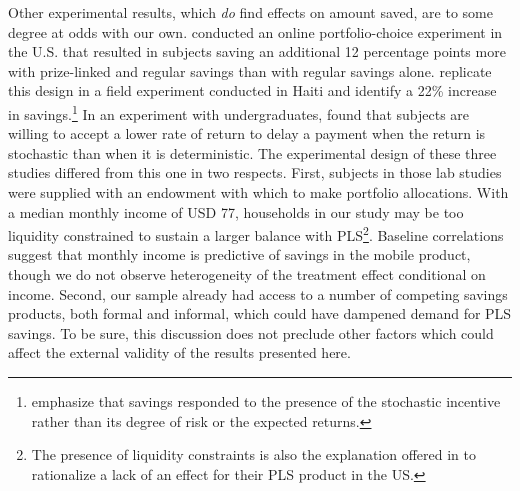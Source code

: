 \documentclass[11pt]{article}
\begin{document}
		Other experimental results, which \emph{do} find effects on amount saved, are to some degree at odds with our own. \textcite{atalay_savings_2014} conducted an online portfolio-choice experiment in the U.S. that resulted in subjects saving an additional 12 percentage points more with prize-linked and regular savings than with regular savings alone. \textcite{dizon_leveraging_2016} replicate this design in a field experiment conducted in Haiti and identify a 22\% increase in savings.\footnote{\textcite{dizon_leveraging_2016} emphasize that savings responded to the presence of the stochastic incentive rather than its degree of risk or the expected returns.} In an experiment with undergraduates, \textcite{filiz-ozbay_lottery_2015} found that subjects are willing to accept a lower rate of return to delay a payment when the return is stochastic than when it is deterministic. The experimental design of these three studies differed from this one in two respects. First, subjects in those lab studies were supplied with an endowment with which to make portfolio allocations. With a median monthly income of USD 77, households in our study may be too liquidity constrained to sustain a larger balance with PLS\footnote{The presence of liquidity constraints is also the explanation offered in \textcite{loibl_testing_2016} to rationalize a lack of an effect for their PLS product in the US.}. Baseline correlations suggest that monthly income is predictive of savings in the mobile product, though we do not observe heterogeneity of the treatment effect conditional on income. Second, our sample already had access to a number of competing savings products, both formal and informal, which could have dampened demand for PLS savings. To be sure, this discussion does not preclude other factors which could affect the external validity of the results presented here.



\end{document}
